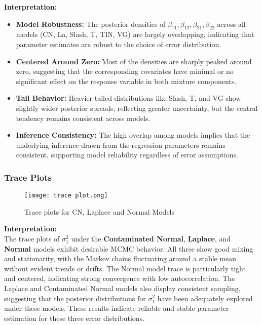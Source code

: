 \documentclass[10.5pt]{article} %
\begin{document}
\textbf{Interpretation:}
\begin{itemize}
    \item \textbf{Model Robustness:} The posterior densities of $\beta_{11}, \beta_{12}, \beta_{21}, \beta_{22}$ across all models (CN, La, Slash, T, TIN, VG) are largely overlapping, indicating that parameter estimates are robust to the choice of error distribution.
    
    \item \textbf{Centered Around Zero:} Most of the densities are sharply peaked around zero, suggesting that the corresponding covariates have minimal or no significant effect on the response variable in both mixture components.
    
    \item \textbf{Tail Behavior:} Heavier-tailed distributions like Slash, T, and VG show slightly wider posterior spreads, reflecting greater uncertainty, but the central tendency remains consistent across models.
    
    \item \textbf{Inference Consistency:} The high overlap among models implies that the underlying inference drawn from the regression parameters remains consistent, supporting model reliability regardless of error assumptions.
\end{itemize}

\subsubsection{Trace Plots}
\begin{figure}[H]
    \centering
    \texttt{[image: trace plot.png]}
    \caption{Trace plots for CN, Laplace and Normal Models}
    \label{fig:image1}
\end{figure}

\vspace{2em}

\textbf{Interpretation:}\\

\vspace{0.5em}
\noindent
The trace plots of $\sigma^2_1$ under the \textbf{Contaminated Normal}, \textbf{Laplace}, and \textbf{Normal} models exhibit desirable MCMC behavior. All three show good mixing and stationarity, with the Markov chains fluctuating around a stable mean without evident trends or drifts. The Normal model trace is particularly tight and centered, indicating strong convergence with low autocorrelation. The Laplace and Contaminated Normal models also display consistent sampling, suggesting that the posterior distributions for $\sigma^2_1$ have been adequately explored under these models. These results indicate reliable and stable parameter estimation for these three error distributions.
\end{document}
